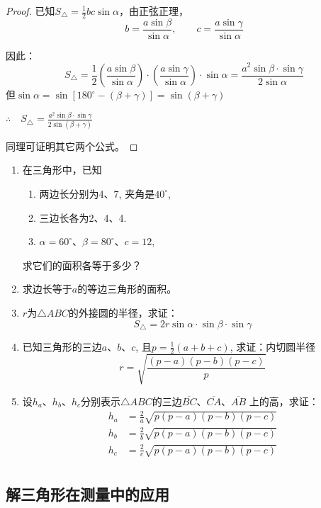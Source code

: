 \begin{proof}
已知$S_{\triangle}=\frac{1}{2}bc\sin\alpha$，由正弦正理，
\[b=\frac{a\sin \beta}{\sin\alpha},\qquad c=\frac{a\sin\gamma}{\sin\alpha}\]

因此：
\[S_{\triangle}=\frac{1}{2}\left(\frac{a\sin \beta}{\sin\alpha}\right)\cdot\left(\frac{a\sin\gamma}{\sin\alpha}\right)\cdot \sin\alpha=\frac{a^2\sin\beta\cdot \sin\gamma}{2\sin\alpha}\]
但$\sin\alpha=\sin[180^{\circ}-(\beta+\gamma)]=\sin(\beta+\gamma)$

$\therefore\quad S_{\triangle}=\frac{a^{2} \sin \beta \cdot \sin \gamma}{2 \sin (\beta+\gamma)}$

同理可证明其它两个公式。
\end{proof}


\begin{ex}
\begin{enumerate}
    \item 在三角形中，已知
\begin{enumerate}
\item 两边长分别为4、7, 夹角是$40^{\circ}$,
\item 三边长各为2、4、4.
\item $\alpha=60^{\circ}$、$\beta=80^{\circ}$、$c=12$,
\end{enumerate}
    求它们的面积各等于多少？
    \item 求边长等于$a$的等边三角形的面积。

    \item $r$为$\triangle ABC$的外接圆的半径，求证：
\[S_{\triangle}=2r \sin\alpha\cdot\sin\beta\cdot \sin\gamma\]

\item 已知三角形的三边$a$、$b$、$c$, 且$p=\frac{1}{2}(a+b+c)$, 
求证：内切圆半径
\[r=\sqrt{\frac{(p-a)(p-b)(p-c)}{p}}\]

\item 设$h_a$、$h_b$、$h_c$分别表示$\triangle ABC$的三边$\overline{BC}$、$\overline{CA}$、$\overline{AB}$
上的高，求证：
\[\begin{split}
    h_a&=\frac{2}{a}\sqrt{p(p-a)(p-b)(p-c)}\\
    h_b&=\frac{2}{b}\sqrt{p(p-a)(p-b)(p-c)}\\
    h_c&=\frac{2}{c}\sqrt{p(p-a)(p-b)(p-c)}\\
\end{split}\]
\end{enumerate}
\end{ex}

\subsection{解三角形在测量中的应用}

